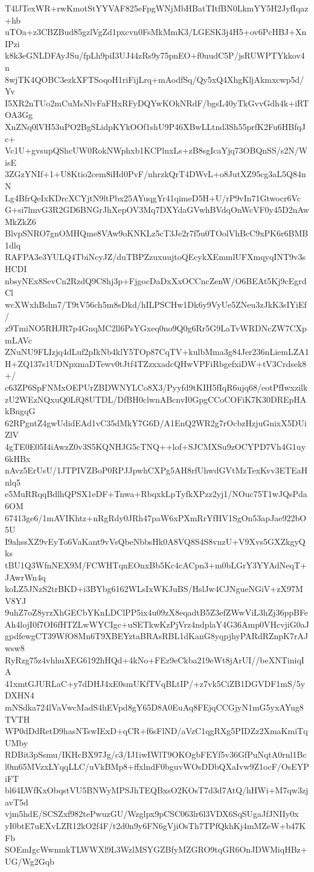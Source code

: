 T4lJTexWR+rwKmotStYYVAF825eFpgWNjMbHBatTItfBN0LkmYY5H2JyfIqaz+hb
uTOa+z3CBZBud85gzlVgZd1pxcvn0FsMkMmK3/LGESK3j4H5+ov6PcHBJ+XnIPzi
k8k3eGNLDFAyJSu/fpLh9piI3UJ44zRs9y75pnEO+f0uudC5P/jsRUWPTYkkov4n
8wjTK4QOBC3ezkXFTSoqoH1riFijLrq+mAodfSq/Qy5xQ4XhgKljAkmxcwp5d/Yv
I5XR2nTUo2mCuMsNlvFaFHxRFyDQYwKOkNRdF/bgsL40yTkGvvGdh4k+iRTOA3Gg
XnZNq0lVH53uPO2BgSLidpKYkOOf1shU9P46XBwLLtnd3Sh55prfK2Fu6HBfqJc+
Vc1U+gvsupQShcUW0RokNWphxb1KCPlnxLs+zB8sgIcaYjq73OBQnSS/s2N/WisE
3ZGzYNIf+1+U8Ktio2cem8iHd0PvF/nhrzkQrT4DWvL+o8JutXZ95cg3aL5Q84nN
Lg4BfrQeIxKDrcXCYjtN9ltPbx25AYuqgYr41qimeD5H+U/rP9vIn71Gtwocr6Vc
G+si7lmvG3R2GD6BNGrJhXepOV3Mq7DXYdaGVwhBVdqOnWcVF0y45D2nAwMkZkZ6
BlvpSNRO7gnOMHQme8VAw9oKNKLz5cT3Je2r7f5u0TOolVhBcC9xPK6r6BMB1dlq
RAFPA3e3YULQ4TbiNcyJZ/duTBPZzuxuujtoQEcykXEmmlUFXmqyqINT9v3sHCDI
nbsyNEx8SevCn2RzdQ9C8hj3p+FjgocDaDxXxOCCncZenW/O6BEAt5Kj9cEgrdCl
wcXWxhBslm7/T9tV56ch5m8sDkd/hILPSCHw1Dk6y9VyUe5ZNeu3zJkK3sIYiEf/
z9TmiNO5RHJR7p4GnqMC2ll6PsYGxeq0no9Q0g6Rr5G9LaTvWRDNcZW7CXpmLAVc
ZNuNU9FLIzjq4dLuf2pIkNb4klY5TOp87CqTV+kulbMma3g84Jer236nLiemLZA1
H+ZQ137s1UDNpxmaDTewv0tJtf4TZzxxadcQHwVPFiRbgefxiDW+tV3Crdsek8+/
c63ZP6SpFNMxOEPUrZBDWNYLCo8X3/Pyyfd9tKIH5fIqR6ujq68/eotPfIwxzilk
zU2WEzNQxuQ0LfQ8UTDL/DfBH0clwnABcnvI0GpgCCoCOFiK7K30DREpHAkBngqG
62RPgntZ4gwUdidEAd1vC35dMkY7G6D/A1EnQ2WR2g7rOcbzHzjuGnixX5DUiZlV
4gTE0E05I4iAwzZ0v3S5KQNHJG5cTNQ++lof+SJCMXSu9zOCYPD7Vh4G1uy6kHBx
nAvz5ErUsU/1JTPIVZBoP0RPJJpwhCXPg5AH8rfUhwdGVtMzTexKvv3ETEaHnlq5
e5MuRRqqBdlhQPSX1eDF+Tnwa+RbqxkLpTyfkXPzz2yj1/NOuc75T1wJQsPda6OM
67413ge6/1mAVIKhtz+nRgRdy0JRh47paW6xPXmRrYfHV1SgOn53apJae922bO5U
I9ahssXZ9vEyTo6VaKant9vVsQbeNbbsHk0A8VQ8S4S8vnzU+V9Xvs5GXZkgyQks
tBU1Q3WfnNEX9M/FCWHTqnEOnxBb5Kc4cACpn3+m0bLGrY3YYAdNeqT+JAwrWn4q
koLZ5JNzS2trBKD+i3BYbg6162WLsIxWKJuBS/HslJw4CJNgueNGiV+zX97MV8YJ
9uhZ7oZ8yrzXhGECbYKnLDClPP5ix4u09zX8eqadtB5Z3efZWwViL3hZj36ppBFe
Ah4lojI0f7OI6fHTZLwWYCIgc+uSETkwKzPjVrz4ndplaY4G36Amp0VHcvjiG0aJ
gpdfewgCT39WfO8Mn6T9XBEYztaBRAsRBL1dKanG8yqpjhyPARdRZnpK7rAJwsw8
RyRzg75z4vhhuXEG6192hHQd+4kNo+FEz9eCkba219eWt8jArUI//beXNTiniqIA
41xmtGJURLaC+y7dDHJ4xE0smUKfTVqBLtIP/+z7vk5CiZB1DGVDF1mS/5yDXHN4
mNSdka724lVaVwcMadS4hEVpd8gY65D8A0EuAq8FEjqCCGjyN1mG5yxAYug8TVTH
WP0dDdRetD9hasNTswIExD+qCR+f6sFlND/aVzC1qgRXg5PIDZz2XmaKmiTqUMby
RDBit3pSsmu/IKHcBX97Jg/c3/IJ1iwIWlT9OKOgbFEYf5v36GfPuNqtA0rnl1Bc
l0m65MVzxLYqqLLC/uVkBMp8+ffxlndF0bguvWOsDDbQXaIvw9Z1ocF/OsEYPiFT
bl64LWfKxObqstVU5BNWyMPSJhTEQBxsO2KOsT7d3d7AtQ/hHWi+M7qw3zjavT5d
vjm5hdE/SCSZxf982tePwuzGU/Wzglpx9pCSC063lr6l3VDX6SqSUgaJfJNIIy0x
yI0btE7uEXvLZR12kO2f4F/t2d0n9y6FN6gVjiOsTh7TPfQkhKj4mMZeW+b47KFb
SOEmIgcWwnmkTLWWXl9L3WzlMSYGZBfyMZGRO9tqGR6OnJDWMiqHBz+UG/Wg2Gqb
